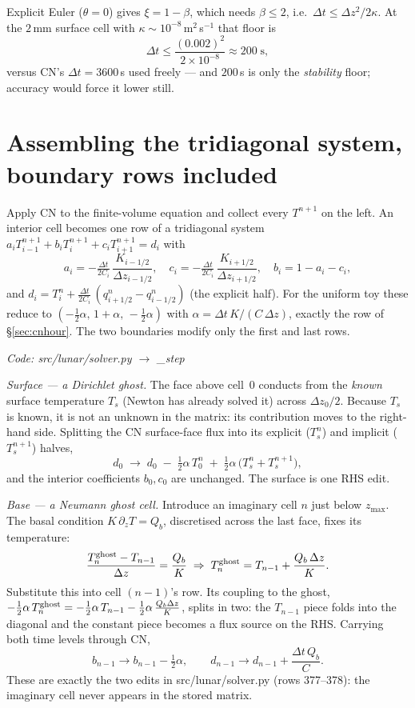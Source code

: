 \documentclass[11pt]{report}
\newcommand{\code}[1]{{\ttfamily\small #1}}
\begin{document}
Explicit Euler ($\theta=0$) gives $\xi=1-\beta$, which needs
$\beta\le2$, i.e.\ $\Delta t\le\Delta z^2/2\kappa$. At the $2$\,mm surface cell
with $\kappa\sim10^{-8}$\,m$^2$\,s$^{-1}$ that floor is
\[
\Delta t \le \frac{(0.002)^2}{2\times10^{-8}} \approx 200\;\text{s},
\]
versus CN's $\Delta t=3600$\,s used freely --- and $200$\,s is only the
\emph{stability} floor; accuracy would force it lower still.

\section{Assembling the tridiagonal system, boundary rows included}\label{app:assembly}
Apply CN to the finite-volume equation and collect every $T^{n+1}$ on the left.
An interior cell becomes one row of a tridiagonal system
$a_i T_{i-1}^{n+1}+b_i T_i^{n+1}+c_i T_{i+1}^{n+1}=d_i$ with
\[
a_i=-\tfrac{\Delta t}{2C_i}\,\frac{K_{i-1/2}}{\Delta z_{i-1/2}},\quad
c_i=-\tfrac{\Delta t}{2C_i}\,\frac{K_{i+1/2}}{\Delta z_{i+1/2}},\quad
b_i=1-a_i-c_i,
\]
and $d_i=T_i^n+\tfrac{\Delta t}{2C_i}\,(q_{i+1/2}^n-q_{i-1/2}^n)$ (the explicit
half). For the uniform toy these reduce to $(-\tfrac12\alpha,\,1+\alpha,\,
-\tfrac12\alpha)$ with $\alpha=\Delta t\,K/(C\,\Delta z)$, exactly the row of
\S\ref{sec:cnhour}. The two boundaries modify only the first and last rows.

{\small\color{dim}\textit{Code: \code{src/lunar/solver.py} $\to$ \code{\_step}}}

\emph{Surface --- a Dirichlet ghost.} The face above cell~0 conducts from the
\emph{known} surface temperature $T_s$ (Newton has already solved it) across
$\Delta z_0/2$. Because $T_s$ is known, it is not an unknown in the matrix: its
contribution moves to the right-hand side. Splitting the CN surface-face flux
into its explicit ($T_s^n$) and implicit ($T_s^{n+1}$) halves,
\[
d_0 \;\to\; d_0 \;-\;\tfrac12\alpha\,T_0^{n}
\;+\;\tfrac12\alpha\,\big(T_s^{n}+T_s^{n+1}\big),
\]
and the interior coefficients $b_0,c_0$ are unchanged. The surface is one RHS
edit.

\emph{Base --- a Neumann ghost cell.} Introduce an imaginary cell $n$ just below
$z_{\max}$. The basal condition $K\,\partial_z T=Q_b$, discretised across the last
face, fixes its temperature:
\[
\frac{T_n^{\rm ghost}-T_{n-1}}{\Delta z}=\frac{Q_b}{K}
\;\Rightarrow\;
T_n^{\rm ghost}=T_{n-1}+\frac{Q_b\,\Delta z}{K}.
\]
Substitute this into cell $(n{-}1)$'s row. Its coupling to the ghost,
$-\tfrac12\alpha\,T_n^{\rm ghost}=-\tfrac12\alpha\,T_{n-1}-\tfrac12\alpha\,
\tfrac{Q_b\Delta z}{K}$, splits in two: the $T_{n-1}$ piece folds into the
diagonal and the constant piece becomes a flux source on the RHS. Carrying both
time levels through CN,
\[
\boxed{\;b_{n-1}\to b_{n-1}-\tfrac12\alpha,\qquad
d_{n-1}\to d_{n-1}+\frac{\Delta t\,Q_b}{C}.\;}
\]
These are exactly the two edits in \code{src/lunar/solver.py} (rows 377--378):
the imaginary cell never appears in the stored matrix.
\end{document}
